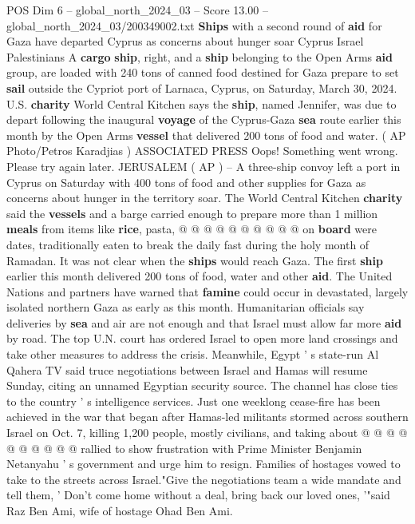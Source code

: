 \begin{textsample}{POS Dim 6 – global\_north\_2024\_03 – Score 13.00 – global\_north\_2024\_03/200349002.txt}  \label{ex:f6_pos_047}
\textbf{Ships} with a second round of \textbf{aid} for Gaza have departed Cyprus as concerns about hunger soar Cyprus Israel Palestinians A \textbf{cargo} \textbf{ship}, right, and a \textbf{ship} belonging to the Open Arms \textbf{aid} group, are loaded with 240 tons of canned food destined for Gaza prepare to set \textbf{sail} outside the Cypriot port of Larnaca, Cyprus, on Saturday, March 30, 2024.
U.S. \textbf{charity} World Central Kitchen says the \textbf{ship}, named Jennifer, was due to depart following the inaugural \textbf{voyage} of the Cyprus-Gaza \textbf{sea} route earlier this month by the Open Arms \textbf{vessel} that delivered 200 tons of food and water. ( AP Photo/Petros Karadjias ) ASSOCIATED PRESS Oops!
Something went wrong.
Please try again later.
JERUSALEM ( AP ) -- A three-ship convoy left a port in Cyprus on Saturday with 400 tons of food and other supplies for Gaza as concerns about hunger in the territory soar.
The World Central Kitchen \textbf{charity} said the \textbf{vessels} and a barge carried enough to prepare more than 1 million \textbf{meals} from items like \textbf{rice}, pasta, @ @ @ @ @ @ @ @ @ @ on \textbf{board} were dates, traditionally eaten to break the daily fast during the holy month of Ramadan.
It was not clear when the \textbf{ships} would reach Gaza.
The first \textbf{ship} earlier this month delivered 200 tons of food, water and other \textbf{aid}.
The United Nations and partners have warned that \textbf{famine} could occur in devastated, largely isolated northern Gaza as early as this month.
Humanitarian officials say deliveries by \textbf{sea} and air are not enough and that Israel must allow far more \textbf{aid} by road.
The top U.N. court has ordered Israel to open more land crossings and take other measures to address the crisis.
Meanwhile, Egypt ' s state-run Al Qahera TV said truce negotiations between Israel and Hamas will resume Sunday, citing an unnamed Egyptian security source.
The channel has close ties to the country ' s intelligence services.
Just one weeklong cease-fire has been achieved in the war that began after Hamas-led militants stormed across southern Israel on Oct. 7, killing 1,200 people, mostly civilians, and taking about @ @ @ @ @ @ @ @ @ @ rallied to show frustration with Prime Minister Benjamin Netanyahu ' s government and urge him to resign.
Families of hostages vowed to take to the streets across Israel."Give the negotiations team a wide mandate and tell them, ' Don't come home without a deal, bring back our loved ones, '"said Raz Ben Ami, wife of hostage Ohad Ben Ami.

\end{textsample}
